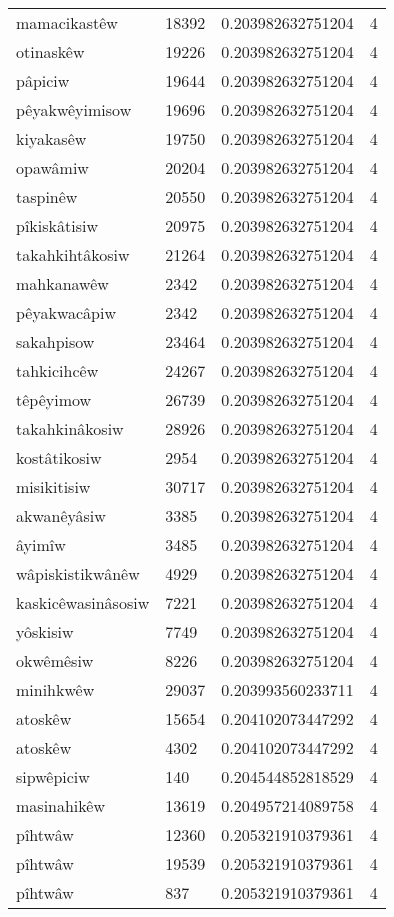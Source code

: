 \begin{longtable}{llll}
mamacikastêw & 18392 & 0.203982632751204 & 4 \\
otinaskêw & 19226 & 0.203982632751204 & 4 \\
pâpiciw & 19644 & 0.203982632751204 & 4 \\
pêyakwêyimisow & 19696 & 0.203982632751204 & 4 \\
kiyakasêw & 19750 & 0.203982632751204 & 4 \\
opawâmiw & 20204 & 0.203982632751204 & 4 \\
taspinêw & 20550 & 0.203982632751204 & 4 \\
pîkiskâtisiw & 20975 & 0.203982632751204 & 4 \\
takahkihtâkosiw & 21264 & 0.203982632751204 & 4 \\
mahkanawêw & 2342 & 0.203982632751204 & 4 \\
pêyakwacâpiw & 2342 & 0.203982632751204 & 4 \\
sakahpisow & 23464 & 0.203982632751204 & 4 \\
tahkicihcêw & 24267 & 0.203982632751204 & 4 \\
têpêyimow & 26739 & 0.203982632751204 & 4 \\
takahkinâkosiw & 28926 & 0.203982632751204 & 4 \\
kostâtikosiw & 2954 & 0.203982632751204 & 4 \\
misikitisiw & 30717 & 0.203982632751204 & 4 \\
akwanêyâsiw & 3385 & 0.203982632751204 & 4 \\
âyimîw & 3485 & 0.203982632751204 & 4 \\
wâpiskistikwânêw & 4929 & 0.203982632751204 & 4 \\
kaskicêwasinâsosiw & 7221 & 0.203982632751204 & 4 \\
yôskisiw & 7749 & 0.203982632751204 & 4 \\
okwêmêsiw & 8226 & 0.203982632751204 & 4 \\
minihkwêw & 29037 & 0.203993560233711 & 4 \\
atoskêw & 15654 & 0.204102073447292 & 4 \\
atoskêw & 4302 & 0.204102073447292 & 4 \\
sipwêpiciw & 140 & 0.204544852818529 & 4 \\
masinahikêw & 13619 & 0.204957214089758 & 4 \\
pîhtwâw & 12360 & 0.205321910379361 & 4 \\
pîhtwâw & 19539 & 0.205321910379361 & 4 \\
pîhtwâw & 837 & 0.205321910379361 & 4 \\

\end{longtable}
